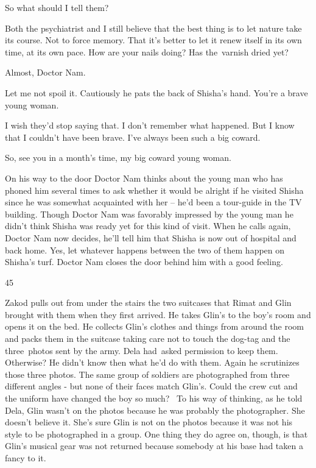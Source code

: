 \documentclass[12pt]{book}
\begin{document}
{\textquotedbl}So what should I tell them?{\textquotedbl}

{\textquotedbl}Both the psychiatrist and I still believe that the best thing is to let nature take its course. Not to
force memory. That it's better to let it renew itself in its own time, at its own pace. How are your nails doing? Has
the~varnish dried yet?{\textquotedbl}

{\textquotedbl}Almost, Doctor Nam.{\textquotedbl}

{\textquotedbl}Let me not spoil it.{\textquotedbl} Cautiously he pats the back of Shisha's hand. {\textquotedbl}You're a
brave young woman.{\textquotedbl}

{\textquotedbl}I wish they'd stop saying that. I don't remember what happened. But I know that I couldn't have been
brave. I've always been such a big coward.{\textquotedbl}

{\textquotedbl}So, see you in a month's time, my big coward young woman.{\textquotedbl}

On his way to the door Doctor Nam thinks about the young man who has phoned him several times to ask whether it would be
alright if he visited Shisha since he was somewhat acquainted with her -- he'd been a tour-guide in the TV building.
Though Doctor Nam was favorably impressed by the young man he didn't think Shisha was ready yet for this kind of visit.
When he calls again, Doctor Nam now decides, he'll tell him that Shisha is now out of hospital and back home. Yes, let
whatever happens between the two of them happen on Shisha's turf. Doctor Nam closes the door behind him with a good
feeling.


\bigskip

45

Zakod pulls out from under the stairs the two suitcases that Rimat and Glin brought with them when they first arrived.
He takes Glin's to the boy's room and opens it on the bed. He collects Glin's clothes and things from around the room
and packs them in the suitcase taking care not to touch the dog-tag and the three~photos sent by the army. Dela
had~asked permission to keep them. Otherwise? He didn't know then what he'd do with them. Again he scrutinizes those
three photos. The same group of soldiers are photographed from three different angles - but none of their faces match
Glin's. Could the crew cut and the uniform have changed the boy so much? \ To his way of thinking, as he told Dela,
Glin wasn't on the photos because he was probably the photographer. She doesn't believe it. She's sure Glin is not on
the photos because it was not his style to be photographed in a group. One thing they do agree on, though, is that
Glin's musical gear was not returned because somebody at his base had taken a fancy to it.
\end{document}
